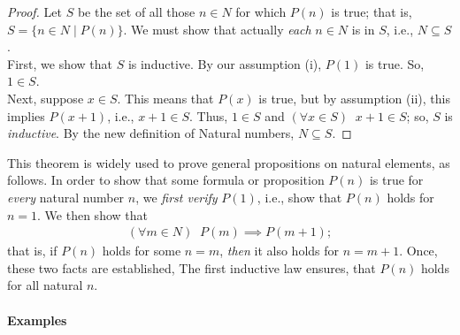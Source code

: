 \documentclass[12pt]{book}
\theoremstyle{definition}
\begin{document}
\begin{proof}
	Let $S$ be the set of all those $n \in N$ for which $P(n)$ is true; that is, $S =\{n \in N \;|\; P(n) \} $. We must show that actually \textit{each} $n \in N$ is in $S$, i.e., $N \subseteq S$.\\ 
	\indent First, we show that $S$ is inductive. By our assumption (i), $P(1)$ is true. So, $1 \in S$. \\
	Next, suppose $x \in S$. This means that $P(x)$ is true, but by assumption (ii), this implies $P(x+1)$, i.e., $x+1 \in S$. Thus, $1 \in S$ and $(\forall x \in S)\;\;x+1 \in S$; so, $S$ is \textit{inductive}. By the new definition of Natural numbers, $N \subseteq S$.
\end{proof}
This theorem is widely used to prove general propositions on natural elements, as follows. In order to show that some formula or proposition $P(n)$ is true for \textit{every} natural number $n$, we \textit{ first verify} $P(1)$, i.e., show that $P(n)$ holds for $n=1$. We then show that
\begin{align*}
	(\forall m \in N)\;\;P(m) \implies P(m+1); 
\end{align*}  
that is, if $P(n)$ holds for some $n=m$, \textit{then} it also holds for $n=m+1$. Once, these two facts are established, The first inductive law ensures, that $P(n)$ holds for all natural $n$.\\
\\
\textbf{Examples}
\end{document}
